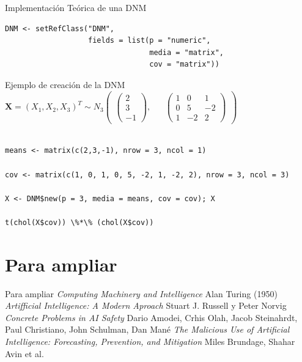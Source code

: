 \documentclass[xcolor=table]{beamer}
\begin{document}
\begin{frame}[fragile]{Implementación Teórica de una DNM}

\begin{lstlisting}
DNM <- setRefClass("DNM", 
                   fields = list(p = "numeric", 
                                 media = "matrix", 
                                 cov = "matrix"))
\end{lstlisting}
\end{frame}

\begin{frame}[fragile]
Ejemplo de creación de la DNM $\pmb{X} = (X_1, X_2, X_3)^T \sim N_3 \begin{pmatrix} \begin{pmatrix} 2 \\ 3 \\ -1 \end{pmatrix}, && \begin{pmatrix} 1 & 0 & 1 \\ 0 & 5 & -2 \\ 1 & -2 & 2 \end{pmatrix} \end{pmatrix} $

\begin{lstlisting}

means <- matrix(c(2,3,-1), nrow = 3, ncol = 1)

cov <- matrix(c(1, 0, 1, 0, 5, -2, 1, -2, 2), nrow = 3, ncol = 3)

X <- DNM$new(p = 3, media = means, cov = cov); X

t(chol(X$cov)) \%*\% (chol(X$cov))

\end{lstlisting}
\end{frame}

\section{Para ampliar}
\begin{frame}{Para ampliar}
\textit{Computing Machinery and Intelligence} Alan Turing (1950)
\newline
\newline
\textit{Artifficial Intelligence: A Modern Aproach} Stuart J. Russell y Peter Norvig
\newline
\newline
\textit{Concrete Problems in AI Safety} Dario Amodei, Crhis Olah, Jacob Steinahrdt, Paul Christiano, John Schulman, Dan Mané
\newline
\newline
\textit{The Malicious Use of Artificial Intelligence: Forecasting, Prevention, and Mitigation} Miles Brundage, Shahar Avin et al.
\end{frame}
\end{document}
